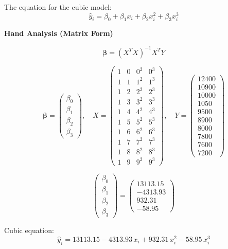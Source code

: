 \documentclass[12pt,a4paper]{article}
\begin{document}
The equation for the cubic model:
\begin{equation}
  \hat{y}_i = \beta_0 + \beta_1 x_i + \beta_2 x_i^2 + \beta_3 x_i^3
\end{equation}

\textbf{Hand Analysis (Matrix Form)}

\[
\bm{\beta} = (X^T X)^{-1} X^T Y
\]

\[
\bm{\beta} = \begin{pmatrix}\beta_0\\\beta_1\\\beta_2\\\beta_3\end{pmatrix},\quad
X = \begin{pmatrix}1&0&0^2&0^3\\1&1&1^2&1^3\\1&2&2^2&2^3\\1&3&3^2&3^3\\1&4&4^2&4^3\\1&5&5^2&5^3\\1&6&6^2&6^3\\1&7&7^2&7^3\\1&8&8^2&8^3\\1&9&9^2&9^3\end{pmatrix},\quad
Y = \begin{pmatrix}12400\\10900\\10000\\1050\\9500\\8900\\8000\\7800\\7600\\7200\end{pmatrix}
\]

\[
\begin{pmatrix}\beta_0\\\beta_1\\\beta_2\\\beta_3\end{pmatrix} = \begin{pmatrix}13113.15\\-4313.93\\932.31\\-58.95\end{pmatrix}
\]

Cubic equation:
\begin{equation}
  \hat{y}_i = 13113.15 - 4313.93\,x_i + 932.31\,x_i^2 - 58.95\,x_i^3
\end{equation}
\end{document}
